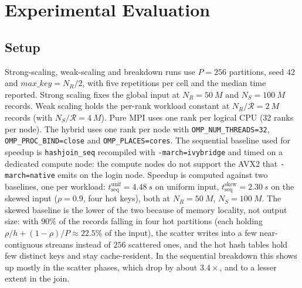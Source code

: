 \documentclass[10pt,twocolumn,a4paper]{article}
\begin{document}
\section{Experimental Evaluation}

\subsection{Setup}
Strong-scaling, weak-scaling and breakdown runs use $P=256$
partitions, seed $42$ and $\textit{max\_key}=N_R/2$, with five
repetitions per cell and the median time reported. Strong scaling
fixes the global input at $N_R=\SI{50}{M}$ and $N_S=\SI{100}{M}$
records. Weak scaling holds the per-rank workload constant at
$N_R/\mathcal{R}=\SI{2}{M}$ records (with $N_S/\mathcal{R}=\SI{4}{M}$). Pure MPI uses
one rank per logical CPU (32 ranks per node). The hybrid uses one
rank per node with \texttt{OMP\_NUM\_THREADS=32},
\texttt{OMP\_PROC\_BIND=close} and \texttt{OMP\_PLACES=cores}.
The sequential baseline used for speedup is \texttt{hashjoin\_seq} recompiled
with \texttt{-march=ivybridge} and timed on a dedicated compute node: the
compute nodes do not support the AVX2 that \texttt{-march=native} emits on
the login node. Speedup is computed against two baselines, one per workload:
$t_{\text{seq}}^{\text{unif}}=\SI{4.48}{s}$ on uniform input,
$t_{\text{seq}}^{\text{skew}}=\SI{2.30}{s}$ on the skewed input
($\rho=0.9$, four hot keys), both at $N_R=\SI{50}{M}$,
$N_S=\SI{100}{M}$. The skewed baseline is the lower of the two
because of memory locality, not output size: with $90\%$ of the
records falling in four hot partitions (each holding
$\rho/h+(1-\rho)/P\approx 22.5\%$ of the input), the scatter writes into a
few near-contiguous streams instead of $256$ scattered ones, and
the hot hash tables hold few distinct keys and stay cache-resident.
In the sequential breakdown this shows up mostly in the scatter
phases, which drop by about $3.4\times$, and to a lesser extent in
the join.
\end{document}
